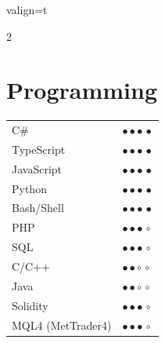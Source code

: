 \documentclass[a4paper,10pt]{article}
\newcommand{\SkillBull}[1]{%
\textcolor{ColorTwo}{#1}
}
\begin{document}
\begin{adjustbox}{valign=t}
\begin{minipage}{0.6\textwidth} %
\begin{multicols}{2}
\section*{Programming}
\begin{tabular}{ll}
	C\# 			& \SkillBull{$\bullet \bullet \bullet \, \bullet$}\\
	TypeScript  	& \SkillBull{$\bullet \bullet \bullet \, \bullet$}\\
	JavaScript  	& \SkillBull{$\bullet \bullet \bullet \, \bullet$}\\
	Python   	    & \SkillBull{$\bullet \bullet \bullet \, \bullet$}\\
	Bash/Shell    & \SkillBull{$\bullet \bullet \bullet \, \bullet$}\\
	PHP  		    & \SkillBull{$\bullet \bullet \bullet \, \circ$}\\
	SQL 		    & \SkillBull{$\bullet \bullet \bullet \, \circ$}\\
	C/C++        	& \SkillBull{$\bullet \bullet \circ \, \circ$}\\
	Java        	& \SkillBull{$\bullet \bullet \circ \, \circ$}\\
	Solidity        & \SkillBull{$\bullet \bullet \bullet \, \circ$}\\
	MQL4 (MetTrader4)& \SkillBull{$\bullet \bullet \bullet \, \circ$}\\
\end{tabular}

\vfill\null \columnbreak  %


\end{multicols}
\end{minipage}
\end{adjustbox}
\end{document}
